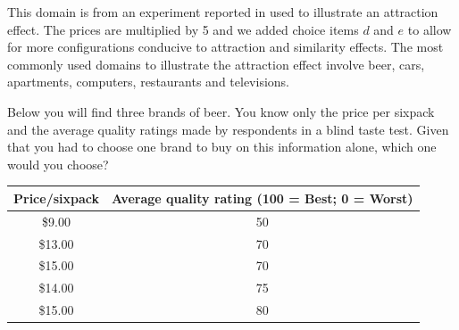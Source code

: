 This domain is from an experiment reported in \citet{HubePaynPuto82} used to illustrate an attraction effect.
The prices are multiplied by 5 and we added choice items $d$ and $e$ to allow for more configurations conducive to attraction and similarity effects.
The most commonly used domains to illustrate the attraction effect involve beer, cars, apartments, computers, restaurants and televisions.

\begin{tcolorbox}
Below you will find three brands of beer.
You know only the price per sixpack and the average quality ratings made by respondents in a blind taste test.
Given that you had to choose one brand to buy on this information alone, which one would you choose?

\begin{tabular}{cc}
\hline
Price/sixpack & Average quality rating (100 = Best; 0 = Worst) \\ 
\hline
\$9.00 & 50 \\ 
\$13.00 & 70 \\ 
\$15.00 & 70 \\ 
\$14.00 & 75 \\ 
\$15.00 & 80 \\ \hline
\end{tabular}
\end{tcolorbox}
